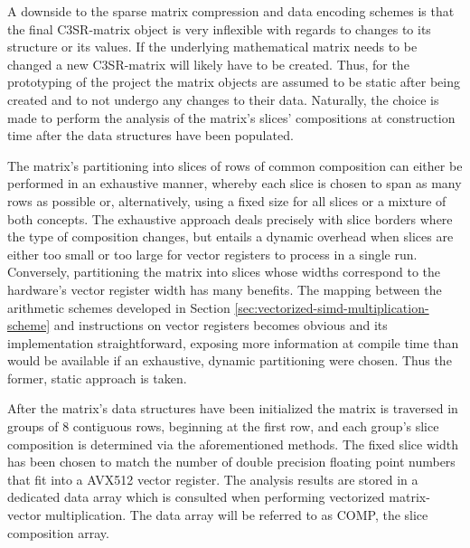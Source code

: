     A downside to the sparse matrix compression and data encoding schemes is that the final C3SR-matrix object is very
    inflexible with regards to changes to its structure or its values. If the underlying mathematical matrix needs to
    be changed a new C3SR-matrix will likely have to be created. Thus, for the prototyping of the project the matrix
    objects are assumed to be static after being created and to not undergo any changes to their data. Naturally, the
    choice is made to perform the analysis of the matrix's slices' compositions at construction time after the data
    structures have been populated. 

    The matrix's partitioning into slices of rows of common composition can either be performed in an exhaustive
    manner, whereby each slice is chosen to span as many rows as possible or, alternatively, using a fixed size for
    all slices or a mixture of both concepts. The exhaustive approach deals precisely with slice borders where the
    type of composition changes, but entails a dynamic overhead when slices are either too small or too large for
    vector registers to process in a single run. Conversely, partitioning the matrix into slices whose widths
    correspond to the hardware's vector register width has many benefits. The mapping between the arithmetic schemes
    developed in Section \ref{sec:vectorized-simd-multiplication-scheme} and instructions on vector registers becomes
    obvious and its implementation straightforward, exposing more information at compile time than would be available
    if an exhaustive, dynamic partitioning were chosen. Thus the former, static approach is taken.

    After the matrix's data structures have been initialized the matrix is traversed in groups of $8$ contiguous rows,
    beginning at the first row, and each group's slice composition is determined via the aforementioned methods. The
    fixed slice width has been chosen to match the number of double precision floating point numbers that fit into a
    AVX512 vector register. The analysis results are stored in a dedicated data array which is consulted when
    performing vectorized matrix-vector multiplication. The data array will be referred to as COMP, the slice
    composition array.

